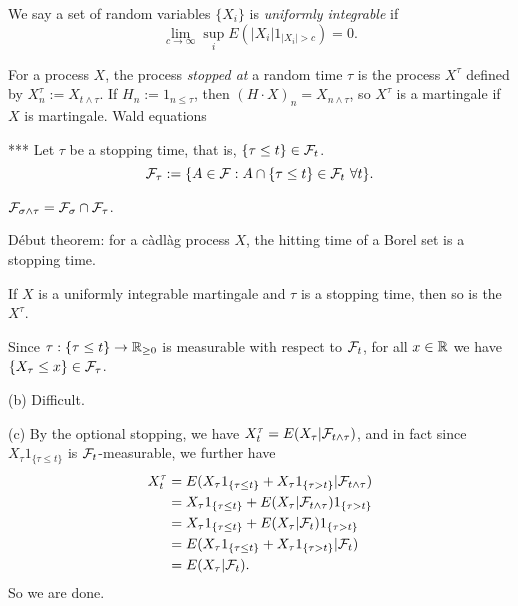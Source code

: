 \documentclass{../../large}
\newcommand{\cadlag}{c\`adl\`ag }
\begin{document}
\begin{prb}
We say a set of random variables $\{X_i\}$ is \emph{uniformly integrable} if
\[\lim_{c\to\infty}\sup_iE(|X_i|1_{|X_i|>c})=0.\]
\end{prb}


\begin{prb}
For a process $X$, the process \emph{stopped at} a random time $\tau$ is the process $X^\tau$ defined by $X^\tau_n:=X_{t\wedge\tau}$.
If $H_n:=1_{n\le\tau}$, then $(H\cdot X)_n=X_{n\wedge\tau}$, so $X^\tau$ is a martingale if $X$ is martingale.
Wald equations
\end{prb}

\begin{prb}***
Let $\tau$ be a stopping time, that is, $\{\tau\le t\}\in\mathcal{F}_t$.
\[\cF_\tau:=\{A\in\cF:A\cap\{\tau\le t\}\in\cF_t\ \forall t\}.\]
\begin{parts}
\item $\mathcal{F}_{\sigma\wedge\tau}=\mathcal{F}_\sigma\cap\mathcal{F}_\tau$.
\item D\'ebut theorem: for a \cadlag process $X$, the hitting time of a Borel set is a stopping time.
\item If $X$ is a uniformly integrable martingale and $\tau$ is a stopping time, then so is the $X^\tau$.
\end{parts}
\end{prb}
\begin{pf}
Since $\tau:\{\tau\le t\}\to\mathbb{R}_{\ge0}$ is measurable with respect to $\mathcal{F}_t$, for all $x\in\mathbb{R}$ we have $\{X_\tau\le x\}\in\mathcal{F}_\tau$.

(b)
Difficult.

(c)
By the optional stopping, we have $X^\tau_t=E(X_\tau|\mathcal{F}_{t\wedge\tau})$, and in fact since $X_\tau1_{\{\tau\le t\}}$ is $\mathcal{F}_t$-measurable, we further have
\begin{align*}
X^\tau_t&=E(X_\tau1_{\{\tau\le t\}}+X_\tau1_{\{\tau>t\}}|\mathcal{F}_{t\wedge\tau})\\
&=X_\tau1_{\{\tau\le t\}}+E(X_\tau|\mathcal{F}_{t\wedge\tau})1_{\{\tau>t\}}\\
&=X_\tau1_{\{\tau\le t\}}+E(X_\tau|\mathcal{F}_t)1_{\{\tau>t\}}\\
&=E(X_\tau1_{\{\tau\le t\}}+X_\tau1_{\{\tau>t\}}|\mathcal{F}_t)\\
&=E(X_\tau|\mathcal{F}_t).
\end{align*}
So we are done.
\end{pf}
\end{document}
